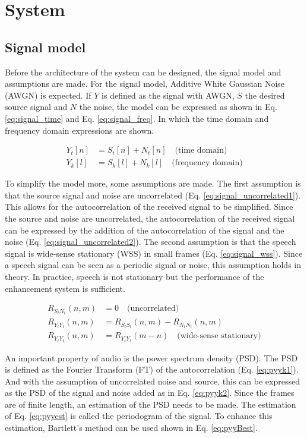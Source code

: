 \section{System} \label{sec:system}
\subsection{Signal model}
Before the architecture of the system can be designed, the signal model and assumptions are made. For the signal model, Additive White Gaussian Noise (AWGN) is expected. If $Y$ is defined as the signal with AWGN, $S$ the desired source signal and $N$ the noise, the model can be expressed as shown in Eq. \ref{eq:signal_time} and Eq. \ref{eq:signal_freq}. In which the time domain and frequency domain expressions are shown.

\begin{align}
  Y_{t}[n] &= S_{t}[n] + N_{t}[n] \quad \text{(time domain)}
  \label{eq:signal_time} \\
  Y_{k}[l] &= S_{k}[l] + N_{k}[l] \quad \text{(frequency domain)}
  \label{eq:signal_freq}
\end{align}

To simplify the model more, some assumptions are made. The first assumption is that the source signal and noise are uncorrelated (Eq. \ref{eq:signal_uncorrelated1}). This allows for the autocorrelation of the received signal to be simplified. Since the source and noise are uncorrelated, the autocorrelation of the received signal can be expressed by the addition of the autocorrelation of the signal and the noise (Eq. \ref{eq:signal_uncorrelated2}). The second assumption is that the speech signal is wide-sense stationary (WSS) in small frames (Eq. \ref{eq:signal_wss}). Since a speech signal can be seen as a periodic signal or noise, this assumption holds in theory. In practice, speech is not stationary but the performance of the enhancement system is sufficient.

\begin{align}
  R_{S_{t}N_{t}}(n,m) &= 0 \quad \text{(uncorrelated)}
  \label{eq:signal_uncorrelated1} \\
  R_{Y_{t}Y_{t}}(n,m) &= R_{S_{t}S_{t}}(n,m) - R_{N_{t}N_{t}}(n,m)
  \label{eq:signal_uncorrelated2} \\
  R_{Y_{t}Y_{t}}(n,m) &= R_{Y_{t}Y_{t}}(m-n) \quad \text{(wide-sense stationary)}
  \label{eq:signal_wss}
\end{align}

An important property of audio is the power spectrum density (PSD). The PSD is defined as the Fourier Transform (FT) of the autocorrelation (Eq. \ref{eq:pyyk1}). And with the assumption of uncorrelated noise and source, this can be expressed as the PSD of the signal and noise added as in Eq. \ref{eq:pyyk2}. Since the frames are of finite length, an estimation of the PSD needs to be made. The estimation of Eq. \ref{eq:pyyest} is called the periodogram of the signal. To enhance this estimation, Bartlett's method can be used shown in Eq. \ref{eq:pyyBest}.


